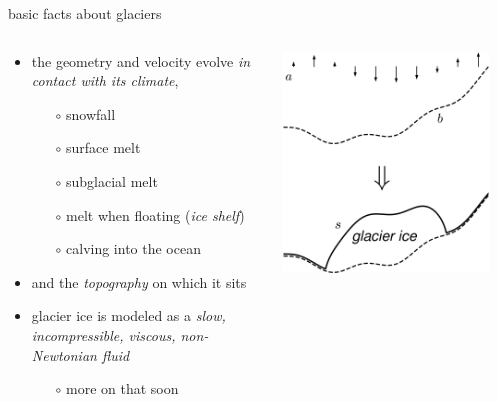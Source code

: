 \documentclass[svgnames,
               hyperref={colorlinks,citecolor=DeepPink4,linkcolor=FireBrick,urlcolor=Maroon},
               usepdftitle=false]  %
               {beamer}
\begin{document}
\begin{frame}{basic facts about glaciers}

\begin{columns}
\begin{column}{0.6\textwidth}
\begin{itemize}
\item the geometry and velocity evolve \emph{in contact with its climate},
    \begin{itemize}
    \item[$\circ$] snowfall
    \item[$\circ$] surface melt
    \item[$\circ$] subglacial melt
    \item[$\circ$] melt when floating (\emph{ice shelf})
    \item[$\circ$] calving into the ocean
    \end{itemize}
\item and the \emph{topography} on which it sits
\item glacier ice is modeled as a \emph{slow, incompressible, viscous, non-Newtonian fluid}
    \begin{itemize}
    \item[$\circ$] more on that soon
    \end{itemize}
\end{itemize}
\end{column}
\begin{column}{0.42\textwidth}
\hfill \includegraphics[width=0.9\textwidth]{images/map-glacier-ice.png}
\end{column}
\end{columns}
\end{frame}
\end{document}
